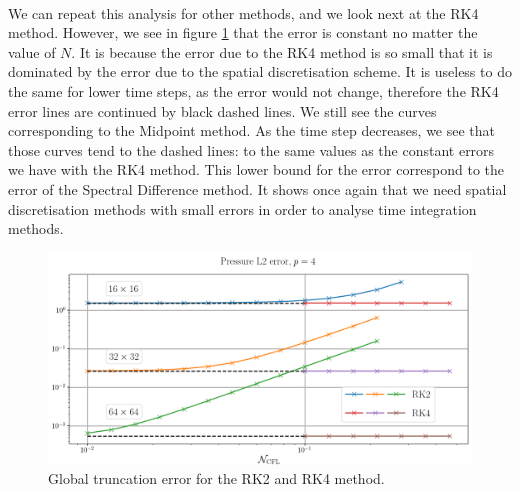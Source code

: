       \paragraph{}
      We can repeat this analysis for other methods, and we look next at the RK4 method.
      However, we see in figure \ref{fig:covo_rk2_rk4} that the error is constant no matter the value of $N$.
      It is because the error due to the RK4 method is so small that it is dominated by the error due to the spatial discretisation scheme.
      It is useless to do the same for lower time steps, as the error would not change, therefore the RK4 error lines are continued by black dashed lines.
      We still see the curves corresponding to the Midpoint method.
      As the time step decreases, we see that those curves tend to the dashed lines: to the same values as the constant errors we have with the RK4 method.
      This lower bound for the error correspond to the error of the Spectral Difference method.
      It shows once again that we need spatial discretisation methods with small errors in order to analyse time integration methods.

      \begin{figure}
        \centering
        \includegraphics[width=\textwidth]{figures/covo_rk2_rk4.png}
        \caption{Global truncation error for the RK2 and RK4 method.}
        \label{fig:covo_rk2_rk4}
      \end{figure}

